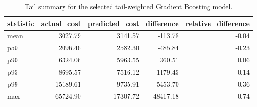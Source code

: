 \begin{table}
\caption{Tail summary for the selected tail-weighted Gradient Boosting model.}
\label{tab:06-selected-mean-tail-summary}
\begin{tabular}{lrrrr}
\toprule
statistic & actual_cost & predicted_cost & difference & relative_difference \\
\midrule
mean & 3027.79 & 3141.57 & -113.78 & -0.04 \\
p50 & 2096.46 & 2582.30 & -485.84 & -0.23 \\
p90 & 6324.06 & 5963.55 & 360.51 & 0.06 \\
p95 & 8695.57 & 7516.12 & 1179.45 & 0.14 \\
p99 & 15189.61 & 9735.91 & 5453.70 & 0.36 \\
max & 65724.90 & 17307.72 & 48417.18 & 0.74 \\
\bottomrule
\end{tabular}
\end{table}
